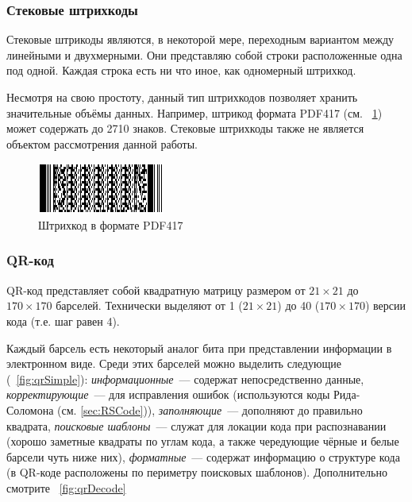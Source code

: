 \subsubsection{Стековые штрихкоды}  
Стековые штрикоды являются, в некоторой мере, переходным вариантом
между линейными и двухмерными. Они представляю собой строки расположенные
одна под одной. Каждая строка есть ни что иное, как одномерный штрихкод.

Несмотря на свою простоту, данный тип штрихкодов позволяет хранить 
значительные объёмы данных. Например, штрикод формата PDF417 
(см. \figurename\ \ref{fig:pdf417}) может содержать до 2710 знаков.
Стековые штрихкоды также не является объектом рассмотрения данной
работы. 

\begin{figure}[htb]
    \centering
    \includegraphics{img/pdf417_sample}
    \caption{Штрихкод в формате PDF417}
    \label{fig:pdf417}
\end{figure}

\subsubsection{QR-код}

QR-код представляет собой квадратную матрицу размером от $21 \times 21$ до 
$170 \times 170$ барселей. Технически выделяют от 1 ($21 \times 21$) до
40 ($170 \times 170$) версии кода (т.е. шаг равен 4).

Каждый барсель есть некоторый 
аналог бита при представлении информации в электронном виде. Среди этих
барселей можно выделить следующие (\figurename\ \ref{fig:qrSimple}): 
\textit{информационные}~--- содержат 
непосредственно данные, \textit{корректирующие}~--- для исправления ошибок
(используются коды Рида-Соломона (см. \ref{sec:RSCode})), 
\textit{заполняющие}~---
дополняют до правильно квадрата, \textit{поисковые шаблоны}~--- 
служат для локации кода при распознавании (хорошо заметные квадраты по 
углам кода, а также чередующие чёрные и белые барсели чуть ниже них), 
\textit{форматные}~--- содержат информацию о структуре кода (в QR-коде 
расположены по периметру поисковых шаблонов). Дополнительно смотрите 
\figurename\ \ref{fig:qrDecode}

